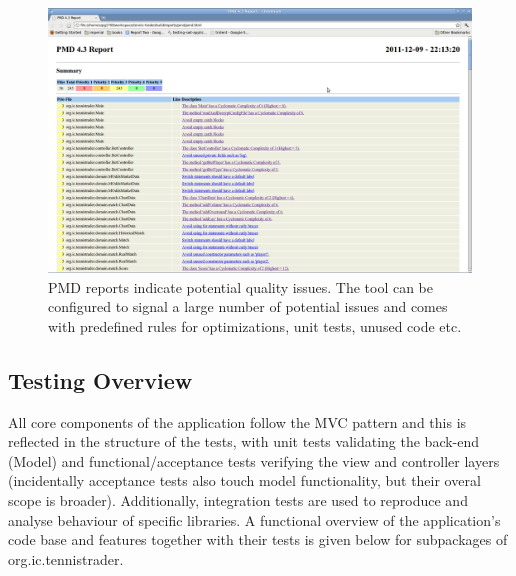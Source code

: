 \documentclass[10pt]{report}
\begin{document}
\begin{figure}[ht]
\centering
\includegraphics[bb=0 0 1680 1050, scale = 0.2]{pmd.png}
\caption{PMD reports indicate potential quality issues. The tool can be configured to signal a large number of potential issues and comes with predefined rules for optimizations, unit tests, unused code etc.}
\end{figure}

\subsection{Testing Overview}

All core components of the application follow the MVC pattern and this is reflected in the structure of the tests, with unit tests validating the back-end (Model) and functional/acceptance tests verifying the view and controller layers (incidentally acceptance tests also touch model functionality, but their overal scope is broader). Additionally, integration tests are used to reproduce and analyse behaviour of specific libraries. A functional overview of the application’s code base and features together with their tests is given below for subpackages of org.ic.tennistrader.
\end{document}
